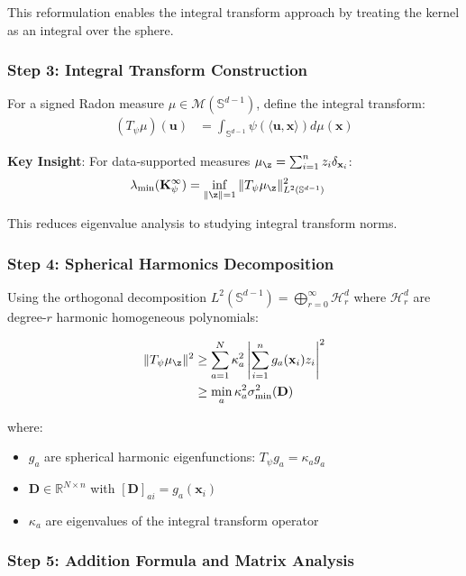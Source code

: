 \documentclass{article}
\newcommand{\x}{\mathbf{x}}
\newcommand{\u}{\mathbf{u}}
\begin{document}
This reformulation enables the integral transform approach by treating the kernel as an integral over the sphere.

\subsubsection{Step 3: Integral Transform Construction}

For a signed Radon measure $\mu \in \mathcal{M}(\mathbb{S}^{d-1})$, define the integral transform:
\begin{align*}
    (T_{\psi}\mu)(\u) &= \int_{\mathbb{S}^{d-1}} \psi(\langle \u, \x \rangle) d\mu(\x)
\end{align*}

\textbf{Key Insight}: For data-supported measures $\mu_{\z} = \sum_{i=1}^n z_i \delta_{\x_i}$:
\begin{align}
    \lambda_{\min}(\mathbf{K}_{\psi}^{\infty}) &= \inf_{\|\z\|=1} \|T_{\psi}\mu_{\z}\|_{L^2(\mathbb{S}^{d-1})}^2
\end{align}

This reduces eigenvalue analysis to studying integral transform norms.

\subsubsection{Step 4: Spherical Harmonics Decomposition}

Using the orthogonal decomposition $L^2(\mathbb{S}^{d-1}) = \bigoplus_{r=0}^{\infty} \mathcal{H}_r^d$ where $\mathcal{H}_r^d$ are degree-$r$ harmonic homogeneous polynomials:

\begin{align}
    \|T_{\psi}\mu_{\z}\|^2 &\geq \sum_{a=1}^N \kappa_a^2 \left|\sum_{i=1}^n g_a(\x_i) z_i\right|^2 \\
    &\geq \min_a \kappa_a^2 \sigma_{\min}^2(\mathbf{D})
\end{align}

where:
\begin{itemize}
    \item $g_a$ are spherical harmonic eigenfunctions: $T_{\psi} g_a = \kappa_a g_a$
    \item $\mathbf{D} \in \mathbb{R}^{N \times n}$ with $[\mathbf{D}]_{ai} = g_a(\x_i)$
    \item $\kappa_a$ are eigenvalues of the integral transform operator
\end{itemize}

\subsubsection{Step 5: Addition Formula and Matrix Analysis}
\end{document}
